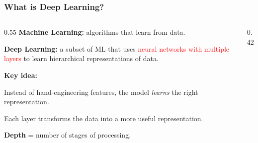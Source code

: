 \documentclass[notes,11pt, aspectratio=169]{beamer}
\newenvironment{wideitemize}{\itemize\addtolength{\itemsep}{10pt}}{\enditemize}
\begin{document}
\begin{frame}
\frametitle{What is Deep Learning?}

\begin{columns}[T]
\begin{column}{0.55\textwidth}
\textbf{Machine Learning:} algorithms that learn from data.

\vspace{6pt}
\textbf{Deep Learning:} a subset of ML that uses \textcolor{red}{neural networks with multiple layers} to learn hierarchical representations of data.

\vspace{6pt}
\textbf{Key idea:}
\begin{wideitemize}
    \item Instead of hand-engineering features, the model \emph{learns} the right representation.
    \item Each layer transforms the data into a more useful representation.
    \item \textbf{Depth} = number of stages of processing.
\end{wideitemize}
\end{column}

\begin{column}{0.42\textwidth}
\begin{center}
\end{center}
\end{column}
\end{columns}
\end{frame}
\end{document}
